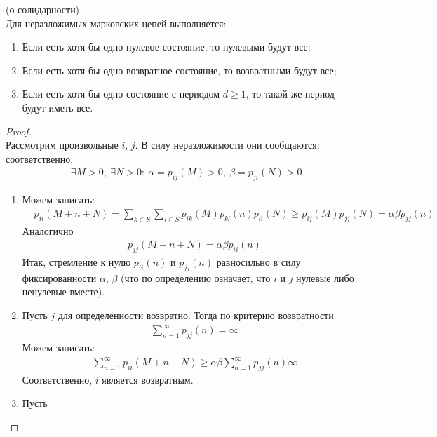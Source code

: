 \begin{theorem} (о солидарности)
    \\
    Для неразложимых марковских цепей выполняется:
    \begin{enumerate}
        \item Если есть хотя бы одно нулевое состояние, то нулевыми будут все;
        \item Если есть хотя бы одно возвратное состояние, то возвратными будут
        все;
        \item Если есть хотя бы одно состояние с периодом $d \geq 1$, то такой
        же период будут иметь все.
    \end{enumerate}
\end{theorem}
\begin{proof}
    ~
    \\
    Рассмотрим произвольные $i$, $j$. В силу неразложимости они сообщаются;
    соответственно,
    \begin{align*}
      & \exists M > 0, \ \exists N > 0: \ \alpha = p_{ij}(M) > 0, \ \beta = p_{ji}(N) > 0
    \end{align*}
    \begin{enumerate}
        \item Можем записать:
        \begin{align*}
          & p_{ii}(M+n+N) = \sum_{k \in S}\sum_{l \in S} p_{ik}(M)p_{kl}(n)p_{li}(N) \geq p_{ij}(M)p_{jj}(N) = \alpha \beta p_{jj}(n)
        \end{align*}
        Аналогично
        \begin{align*}
          & p_{jj}(M+n+N) = \alpha \beta p_{ii}(n)
        \end{align*}
        Итак, стремление к нулю $p_{ii}(n)$ и $p_{jj}(n)$ равносильно в силу
        фиксированности $\alpha$, $\beta$ (что по определению означает, что $i$
        и $j$ нулевые либо ненулевые вместе).
        \item Пусть $j$ для определенности возвратно. Тогда по критерию
        возвратности
        \begin{align*}
          & \sum_{n=1}^\infty p_{jj}(n) = \infty
        \end{align*}
        Можем записать:
        \begin{align*}
          & \sum_{n=1}^\infty p_{ii}(M+n+N) \geq \alpha \beta \sum_{n=1}^\infty p_{jj}(n) \infty
        \end{align*}
        Соответственно, $i$ является возвратным.
        \item Пусть

\end{enumerate}
\end{proof}
